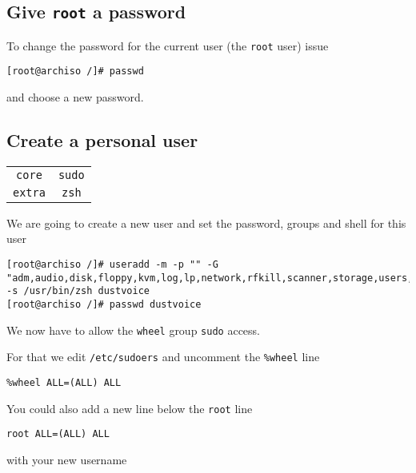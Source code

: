 \documentclass[9pt]{report}
\begin{document}
\vfill\eject

\hypertarget{x-give-root-a-password}{\subsection{Give \texttt{root} a password}}
To change the password for the current user (the \texttt{root} user) issue


\begin{verbatim}
[root@archiso /]# passwd
\end{verbatim}

and choose a new password.



\vfill\eject

\hypertarget{x-create-a-personal-user}{\subsection{Create a personal user}}
\begin{center}
\begin{tabular}{|c|c|}
\hline
\texttt{core} & \texttt{sudo} \\ 
\texttt{extra} & \texttt{zsh} \\ 
\hline
\end{tabular}
\end{center}

We are going to create a new user and set the password, groups and shell for this user


\begin{verbatim}
[root@archiso /]# useradd -m -p "" -G "adm,audio,disk,floppy,kvm,log,lp,network,rfkill,scanner,storage,users,optical,power,wheel" -s /usr/bin/zsh dustvoice
[root@archiso /]# passwd dustvoice
\end{verbatim}

We now have to allow the \texttt{wheel} group \texttt{sudo} access.


For that we edit \texttt{/etc/sudoers} and uncomment the \texttt{\%wheel} line


\begin{verbatim}
%wheel ALL=(ALL) ALL
\end{verbatim}

You could also add a new line below the \texttt{root} line


\begin{verbatim}
root ALL=(ALL) ALL
\end{verbatim}

with your new username
\end{document}
